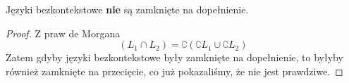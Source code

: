 \begin{theorem}
    Języki bezkontekstowe \textbf{nie} są zamknięte na dopełnienie.
\end{theorem}
\begin{proof}
    Z praw de Morgana
    \[
        (L_1 \cap L_2) = \complement{(\complement{L_1} \cup \complement{L_2})}
    \]
    Zatem gdyby języki bezkontekstowe były zamknięte na dopełnienie, to byłyby również zamknięte na przecięcie, co już pokazaliśmy, że nie jest prawdziwe.
\end{proof}